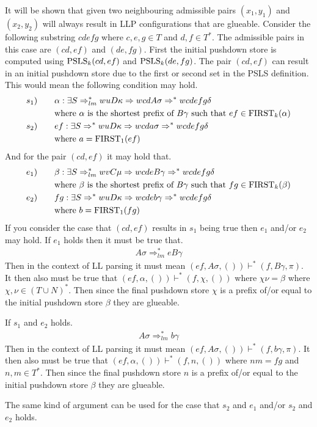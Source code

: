 It will be shown that given two neighbouring admissible pairs $(x_1, y_1)$ and $(x_2, y_2)$ will always result in LLP configurations that are glueable. Consider the following substring $cdefg$ where $c, e, g \in T$ and $d, f \in T^*$. The admissible pairs in this case are $(cd, ef)$ and $(de, fg)$. First the initial pushdown store is computed using $\text{PSLS}_k(cd, ef)$ and $\text{PSLS}_k(de, fg)$. The pair $(cd, ef)$ can result in an initial pushdown store due to the first or second set in the PSLS definition. This would mean the following condition may hold.
\begin{align*}
    s_1) \qquad & \alpha : \exists S \Rightarrow^*_{lm} wuD\kappa \Rightarrow wcdA\sigma \Rightarrow^* wcdefg\delta \\
    & \text{where } \alpha \text{ is the shortest prefix of } B\gamma \text{ such that } ef \in \text{FIRST}_k(\alpha) \\
    s_2) \qquad & ef : \exists S \Rightarrow^* wuD\kappa \Rightarrow wcda\sigma \Rightarrow^* wcdefg\delta \\
    & \text{where } a = \text{FIRST}_1(ef)
\end{align*}
And for the pair $(cd, ef)$ it may hold that.
\begin{align*}
    e_1) \qquad & \beta : \exists S \Rightarrow^*_{lm} wvC\mu \Rightarrow wcdeB\gamma \Rightarrow^* wcdefg\delta \\
    & \text{where } \beta \text{ is the shortest prefix of } B\gamma \text{ such that } fg \in \text{FIRST}_k(\beta) \\
    e_2) \qquad & fg : \exists S \Rightarrow^* wuD\kappa \Rightarrow wcdeb\gamma \Rightarrow^* wcdefg\delta \\
    & \text{where } b = \text{FIRST}_1(fg)
\end{align*}
If you consider the case that $(cd, ef)$ results in $s_1$ being true then $e_1$ and/or $e_2$ may hold. If $e_1$ holds then it must be true that.
\begin{align*}
    A\sigma \Rightarrow^*_{lm} eB\gamma
\end{align*}
Then in the context of LL parsing it must mean $(ef, A\sigma, ()) \vdash^* (f, B\gamma, \pi)$. It then also must be true that $(ef, \alpha, ()) \vdash^* (f, \chi, ())$ where $\chi\nu = \beta$ where $\chi, \nu \in (T \cup N)^*$. Then since the final pushdown store $\chi$ is a prefix of/or equal to the initial pushdown store $\beta$ they are glueable.

If $s_1$ and $e_2$ holds.
\begin{align*}
    A\sigma \Rightarrow^*_{lm} b\gamma 
\end{align*}
Then in the context of LL parsing it must mean $(ef, A\sigma, ()) \vdash^* (f, b\gamma, \pi)$. It then also must be true that $(ef, \alpha, ()) \vdash^* (f, n, ())$ where $nm = fg$ and $n, m \in T^*$. Then since the final pushdown store $n$ is a prefix of/or equal to the initial pushdown store $\beta$ they are glueable.

The same kind of argument can be used for the case that $s_2$ and $e_1$ and/or $s_2$ and $e_2$ holds.